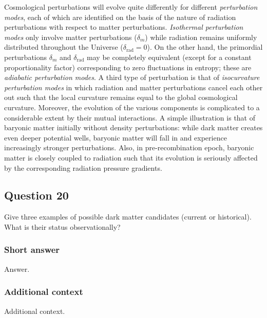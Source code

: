 \documentclass[a4paper,11pt]{article}
\begin{document}
{\noindent}Cosmological perturbations will evolve quite differently for different \textit{perturbation modes}, each of which are identified on the basis of the nature of radiation perturbations with respect to matter perturbations. \textit{Isothermal perturbation modes} only involve matter perturbations ($\delta_m$) while radiation remains uniformly distributed throughout the 
Universe ($\delta_\mathrm{rad} = 0$). On the other hand, the primordial perturbations $\delta_m$ and $\delta_\mathrm{rad}$ may be completely equivalent (except for a constant proportionality factor) corresponding to zero fluctuations in entropy; these are \textit{adiabatic perturbation modes}. A third type of perturbation is that of \textit{isocurvature perturbation modes} in which radiation and matter perturbations cancel each other out such that the local curvature remains equal to the global cosmological curvature. Moreover, the evolution of the various components is complicated to a considerable extent by their mutual interactions. A simple illustration is that of baryonic matter initially without density perturbations: while dark matter creates even deeper potential wells, baryonic matter will fall in and experience increasingly stronger perturbations. Also, in pre-recombination epoch, baryonic matter is closely coupled to radiation such that its evolution is seriously affected by the corresponding radiation pressure gradients.

%
%

\newpage
\subsection{Question 20}

Give three examples of possible dark matter candidates (current or historical). What is their status observationally?

\subsubsection{Short answer}

Answer.

\subsubsection{Additional context}

Additional context.
\end{document}
